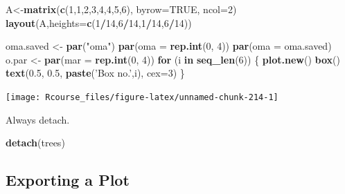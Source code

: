 \documentclass[]{book}
\newenvironment{Shaded}{\begin{snugshade}}{\end{snugshade}}
\newcommand{\KeywordTok}[1]{\textcolor[rgb]{0.13,0.29,0.53}{\textbf{#1}}}
\newcommand{\DataTypeTok}[1]{\textcolor[rgb]{0.13,0.29,0.53}{#1}}
\newcommand{\DecValTok}[1]{\textcolor[rgb]{0.00,0.00,0.81}{#1}}
\newcommand{\FloatTok}[1]{\textcolor[rgb]{0.00,0.00,0.81}{#1}}
\newcommand{\StringTok}[1]{\textcolor[rgb]{0.31,0.60,0.02}{#1}}
\newcommand{\OtherTok}[1]{\textcolor[rgb]{0.56,0.35,0.01}{#1}}
\newcommand{\ControlFlowTok}[1]{\textcolor[rgb]{0.13,0.29,0.53}{\textbf{#1}}}
\newcommand{\OperatorTok}[1]{\textcolor[rgb]{0.81,0.36,0.00}{\textbf{#1}}}
\newcommand{\NormalTok}[1]{#1}
\theoremstyle{definition}
\theoremstyle{definition}
\theoremstyle{definition}
\theoremstyle{remark}
\begin{document}
\begin{Shaded}
\begin{Highlighting}[]
\NormalTok{A<-}\KeywordTok{matrix}\NormalTok{(}\KeywordTok{c}\NormalTok{(}\DecValTok{1}\NormalTok{,}\DecValTok{1}\NormalTok{,}\DecValTok{2}\NormalTok{,}\DecValTok{3}\NormalTok{,}\DecValTok{4}\NormalTok{,}\DecValTok{4}\NormalTok{,}\DecValTok{5}\NormalTok{,}\DecValTok{6}\NormalTok{), }\DataTypeTok{byrow=}\OtherTok{TRUE}\NormalTok{, }\DataTypeTok{ncol=}\DecValTok{2}\NormalTok{)}
\KeywordTok{layout}\NormalTok{(A,}\DataTypeTok{heights=}\KeywordTok{c}\NormalTok{(}\DecValTok{1}\OperatorTok{/}\DecValTok{14}\NormalTok{,}\DecValTok{6}\OperatorTok{/}\DecValTok{14}\NormalTok{,}\DecValTok{1}\OperatorTok{/}\DecValTok{14}\NormalTok{,}\DecValTok{6}\OperatorTok{/}\DecValTok{14}\NormalTok{))}

\NormalTok{oma.saved <-}\StringTok{ }\KeywordTok{par}\NormalTok{(}\StringTok{"oma"}\NormalTok{)}
\KeywordTok{par}\NormalTok{(}\DataTypeTok{oma =} \KeywordTok{rep.int}\NormalTok{(}\DecValTok{0}\NormalTok{, }\DecValTok{4}\NormalTok{))}
\KeywordTok{par}\NormalTok{(}\DataTypeTok{oma =}\NormalTok{ oma.saved)}
\NormalTok{o.par <-}\StringTok{ }\KeywordTok{par}\NormalTok{(}\DataTypeTok{mar =} \KeywordTok{rep.int}\NormalTok{(}\DecValTok{0}\NormalTok{, }\DecValTok{4}\NormalTok{))}
\ControlFlowTok{for}\NormalTok{ (i }\ControlFlowTok{in} \KeywordTok{seq_len}\NormalTok{(}\DecValTok{6}\NormalTok{)) \{}
    \KeywordTok{plot.new}\NormalTok{()}
    \KeywordTok{box}\NormalTok{()}
    \KeywordTok{text}\NormalTok{(}\FloatTok{0.5}\NormalTok{, }\FloatTok{0.5}\NormalTok{, }\KeywordTok{paste}\NormalTok{(}\StringTok{'Box no.'}\NormalTok{,i), }\DataTypeTok{cex=}\DecValTok{3}\NormalTok{)}
\NormalTok{\}}
\end{Highlighting}
\end{Shaded}

\texttt{[image: Rcourse\_files/figure-latex/unnamed-chunk-214-1]}

Always detach.

\begin{Shaded}
\begin{Highlighting}[]
\KeywordTok{detach}\NormalTok{(trees)}
\end{Highlighting}
\end{Shaded}

\subsection{Exporting a Plot}\label{exporting-a-plot}
\end{document}

